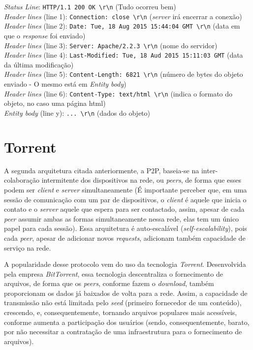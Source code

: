 \emph{Status Line}:
\texttt{HTTP/1.1\ 200\ OK\ \textbackslash{}r\textbackslash{}n} (Tudo
ocorreu bem)\\
\emph{Header lines} (line 1):
\texttt{Connection:\ close\ \textbackslash{}r\textbackslash{}n}
(\emph{server} irá encerrar a conexão)\\
\emph{Header lines} (line 2):
\texttt{Date:\ Tue,\ 18\ Aug\ 2015\ 15:44:04\ GMT\ \textbackslash{}r\textbackslash{}n}
(data em que o \emph{response} foi enviado)\\
\emph{Header lines} (line 3):
\texttt{Server:\ Apache/2.2.3\ \textbackslash{}r\textbackslash{}n} (nome
do servidor)\\
\emph{Header lines} (line 4):
\texttt{Last-Modified:\ Tue,\ 18\ Aud\ 2015\ 15:11:03\ GMT} (data da
última modificação)\\
\emph{Header lines} (line 5):
\texttt{Content-Length:\ 6821\ \textbackslash{}r\textbackslash{}n}
(número de bytes do objeto enviado - O mesmo está em \emph{Entity
body})\\
\emph{Header lines} (line 6):
\texttt{Content-Type:\ text/html\ \textbackslash{}r\textbackslash{}n}
(indica o formato do objeto, no caso uma página html)\\
\emph{Entity body} (line y):
\texttt{...\ \textbackslash{}r\textbackslash{}n} (dados do objeto)

\hypertarget{torrent}{%
\section{Torrent}\label{torrent}}

A segunda arquitetura citada anteriormente, a P2P, baseia-se na
inter-colaboração intermitente dos dispositivos na rede, ou \emph{peers},
de forma que esses podem ser \emph{client} e \emph{server}
simultaneamente (É importante perceber que, em uma sessão de comunicação
com um par de dispositivos, o \emph{client} é aquele que inicia o
contato e o \emph{server} aquele que espera para ser contactado, assim,
apesar de cada \emph{peer} assumir ambas as formas simultaneamente nessa
rede, elas tem um único papel para cada sessão). Essa arquitetura é
auto-escalável (\emph{self-escalability}), pois cada \emph{peer}, apesar
de adicionar novos \emph{requests}, adicionam também capacidade de
serviço na rede.

A popularidade desse protocolo vem do uso da tecnologia \emph{Torrent}.
Desenvolvida pela empresa \emph{BitTorrent}, essa tecnologia
descentraliza o fornecimento de arquivos, de forma que os \emph{peers},
conforme fazem o \emph{download}, também proporcionam os dados já
baixados de volta para a rede. Assim, a capacidade de transmissão não
está limitada pelo \emph{seed} (primeiro fornecedor de um conteúdo),
crescendo, e, consequentemente, tornando arquivos populares mais
acessíveis, conforme aumenta a participação dos usuários (sendo,
consequentemente, barato, por não necessitar a contratação de uma
infraestrutura para o fornecimento de arquivos).

